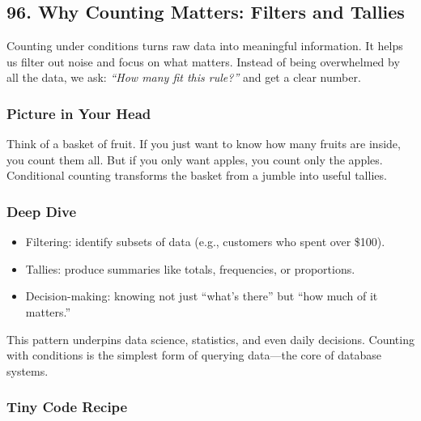 \documentclass[
  letterpaper,
  DIV=11,
  numbers=noendperiod]{scrreprt}
\providecommand{\tightlist}{%
  \setlength{\itemsep}{0pt}\setlength{\parskip}{0pt}}
\begin{document}
\subsection{96. Why Counting Matters: Filters and
Tallies}\label{why-counting-matters-filters-and-tallies}

Counting under conditions turns raw data into meaningful information. It
helps us filter out noise and focus on what matters. Instead of being
overwhelmed by all the data, we ask: \emph{``How many fit this rule?''}
and get a clear number.

\subsubsection{Picture in Your Head}\label{picture-in-your-head-96}

Think of a basket of fruit. If you just want to know how many fruits are
inside, you count them all. But if you only want apples, you count only
the apples. Conditional counting transforms the basket from a jumble
into useful tallies.

\subsubsection{Deep Dive}\label{deep-dive-66}

\begin{itemize}
\tightlist
\item
  Filtering: identify subsets of data (e.g., customers who spent over
  \$100).
\item
  Tallies: produce summaries like totals, frequencies, or proportions.
\item
  Decision-making: knowing not just ``what's there'' but ``how much of
  it matters.''
\end{itemize}

This pattern underpins data science, statistics, and even daily
decisions. Counting with conditions is the simplest form of querying
data---the core of database systems.

\subsubsection{Tiny Code Recipe}\label{tiny-code-recipe-94}
\end{document}
